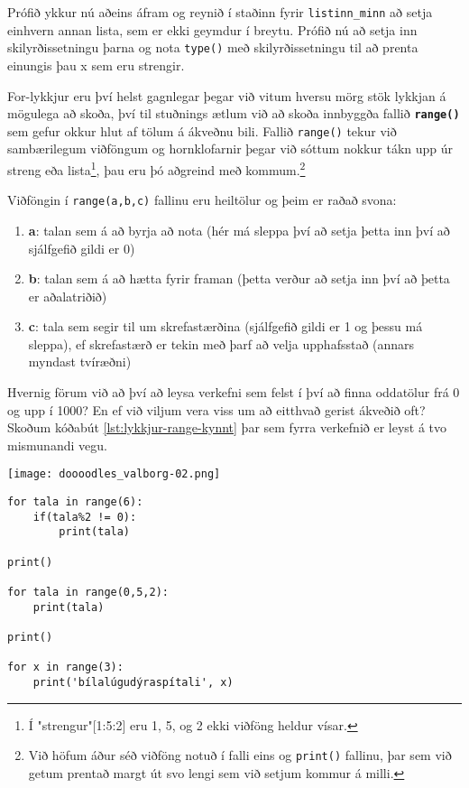 Prófið ykkur nú aðeins áfram og reynið í staðinn fyrir \texttt{listinn\_minn} að setja einhvern annan lista, sem er ekki geymdur í breytu.
Prófið nú að setja inn skilyrðissetningu þarna og nota \texttt{type()} með skilyrðissetningu til að prenta einungis þau x sem eru strengir.

For-lykkjur eru því helst gagnlegar þegar við vitum hversu mörg stök lykkjan á mögulega að skoða, því til stuðnings ætlum við að skoða innbyggða fallið \textbf{\texttt{range()}} sem gefur okkur hlut af tölum á ákveðnu bili.
Fallið \texttt{range()} tekur við sambærilegum viðföngum og hornklofarnir þegar við sóttum nokkur tákn upp úr streng eða lista\footnote{Í "strengur"[1:5:2] eru 1, 5, og 2 ekki viðföng heldur vísar.}, þau eru þó aðgreind með kommum.\footnote{Við höfum áður séð viðföng notuð í falli eins og \texttt{print()} fallinu, þar sem við getum prentað margt út svo lengi sem við setjum kommur á milli.}

Viðföngin í \texttt{range(a,b,c)} fallinu eru heiltölur og þeim er raðað svona:

\begin{enumerate}
	\item \textbf{a}: talan sem á að byrja að nota (hér má sleppa því að setja þetta inn því að sjálfgefið gildi er 0)
	\item \textbf{b}: talan sem á að hætta fyrir framan (þetta verður að setja inn því að þetta er aðalatriðið)
	\item \textbf{c}: tala sem segir til um skrefastærðina (sjálfgefið gildi er 1 og þessu má sleppa), ef skrefastærð er tekin með þarf að velja upphafsstað (annars myndast tvíræðni)
\end{enumerate}

Hvernig förum við að því að leysa verkefni sem felst í því að finna oddatölur frá 0 og upp í 1000?
En ef við viljum vera viss um að eitthvað gerist ákveðið oft?
Skoðum kóðabút \ref{lst:lykkjur-range-kynnt} þar sem fyrra verkefnið er leyst á tvo mismunandi vegu.

\begin{center}
	\texttt{[image: doooodles\_valborg-02.png]}
\end{center}

\begin{lstlisting}[caption=range() fallið kynnt með for lykkju, label=lst:lykkjur-range-kynnt]
for tala in range(6):
	if(tala%2 != 0):
		print(tala)		

print()

for tala in range(0,5,2):
	print(tala)

print()

for x in range(3):
	print('bílalúgudýraspítali', x)
\end{lstlisting}		
		
